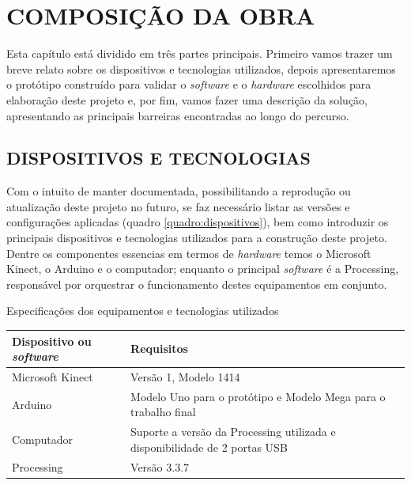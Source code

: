 \chapter{COMPOSIÇÃO DA OBRA}
Esta capítulo está dividido em três partes principais. Primeiro vamos trazer um breve relato sobre os dispositivos e tecnologias utilizados, depois apresentaremos o protótipo construído para validar o \textit{software} e o \textit{hardware} escolhidos para elaboração deste projeto e, por fim, vamos fazer uma descrição da solução, apresentando as principais barreiras encontradas ao longo do percurso. 

\section{DISPOSITIVOS E TECNOLOGIAS}

Com o intuito de manter documentada, possibilitando a reprodução ou atualização deste projeto no futuro, se faz necessário listar as versões e configurações aplicadas (quadro \ref{quadro:dispositivos}), bem como introduzir os principais dispositivos e tecnologias utilizados para a construção deste projeto. Dentre os componentes essencias em termos de \textit{hardware} temos o Microsoft Kinect, o Arduino e o computador; enquanto o principal \textit{software} é a Processing, responsável por orquestrar o funcionamento destes equipamentos em conjunto. 


\begin{quadro}[htb]
\caption{\label{quadro:dispositivos}Especificações dos equipamentos e tecnologias utilizados}
\begin{center}  
  \begin{tabulary}{0.8\textwidth}{|L|L|}
  
  \hline
  \textbf{Dispositivo ou \textit{software}} & \textbf{Requisitos} \\ \hline
  Microsoft Kinect  & Versão 1, Modelo 1414 \\ \hline
  Arduino & Modelo Uno para o protótipo e Modelo Mega para o trabalho final \\ \hline
  Computador & Suporte a versão da Processing utilizada e disponibilidade de 2 portas USB \\ \hline
  Processing & Versão 3.3.7 \\ \hline
  \end{tabulary}
\end{center}
\vspace*{-0,5cm}
\\
\end{quadro}


